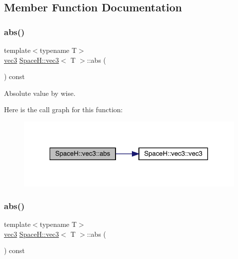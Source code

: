 \subsection{Member Function Documentation}
\mbox{\label{struct_space_h_1_1vec3_af82905f49546b9aa03799dcd87bdff0c}} 
\subsubsection{\texorpdfstring{abs()}{abs()}\hspace{0.1cm}{\footnotesize\ttfamily [1/4]}}
{\footnotesize\ttfamily template$<$typename T$>$ \\
\mbox{\hyperlink{struct_space_h_1_1vec3}{vec3}} \mbox{\hyperlink{struct_space_h_1_1vec3}{Space\+H\+::vec3}}$<$ T $>$\+::abs (\begin{DoxyParamCaption}{ }\end{DoxyParamCaption}) const\hspace{0.3cm}{\ttfamily [inline]}}



Absolute value by wise. 

Here is the call graph for this function\+:
\nopagebreak
\begin{figure}[H]
\begin{center}
\leavevmode
\includegraphics[width=321pt]{struct_space_h_1_1vec3_af82905f49546b9aa03799dcd87bdff0c_cgraph}
\end{center}
\end{figure}
\mbox{\label{struct_space_h_1_1vec3_af82905f49546b9aa03799dcd87bdff0c}} 
\subsubsection{\texorpdfstring{abs()}{abs()}\hspace{0.1cm}{\footnotesize\ttfamily [2/4]}}
{\footnotesize\ttfamily template$<$typename T$>$ \\
\mbox{\hyperlink{struct_space_h_1_1vec3}{vec3}} \mbox{\hyperlink{struct_space_h_1_1vec3}{Space\+H\+::vec3}}$<$ T $>$\+::abs (\begin{DoxyParamCaption}{ }\end{DoxyParamCaption}) const\hspace{0.3cm}{\ttfamily [inline]}}



